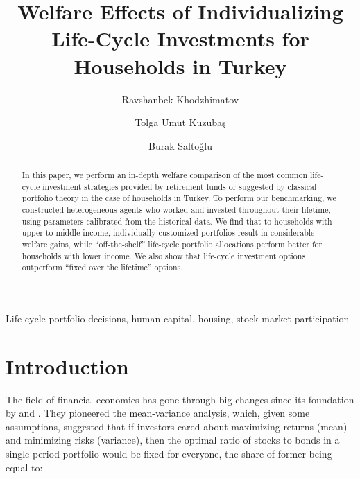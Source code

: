\documentclass[]{elsarticle}
\begin{document}

\begin{frontmatter}


\title{Welfare Effects of Individualizing Life-Cycle Investments for Households in Turkey}


\author{Ravshanbek Khodzhimatov}
\author{Tolga Umut Kuzubaş}
\author{Burak Saltoğlu}

\address{Boğaziçi University, Department of Economics, Natuk Birkan Building, 34342 Bebek, Istanbul, Turkey}


\begin{abstract}
In this paper, we perform an in-depth welfare comparison of the most common life-cycle investment strategies provided by retirement funds or suggested by classical portfolio theory in the case of households in Turkey. To perform our benchmarking, we constructed heterogeneous agents who worked and invested throughout their lifetime, using parameters calibrated from the historical data. We find that to households with upper-to-middle income, individually customized portfolios result in considerable welfare gains, while ``off-the-shelf'' life-cycle portfolio allocations perform better for households with lower income. We also show that life-cycle investment options outperform ``fixed over the lifetime'' options. 
\end{abstract}


\begin{keyword}
	Life-cycle portfolio decisions, human capital, housing, stock market participation
\end{keyword}


\end{frontmatter}


\section{Introduction} %
\label{intro} %

The field of financial economics has gone through big changes since its foundation by \citet{markowitz} and \citet{tobin}. They pioneered the mean-variance analysis, which, given some assumptions, suggested that if investors cared about maximizing returns (mean) and minimizing risks (variance), then the optimal ratio of stocks to bonds in a single-period portfolio would be fixed for everyone, the share of former being equal to:
\end{document}
